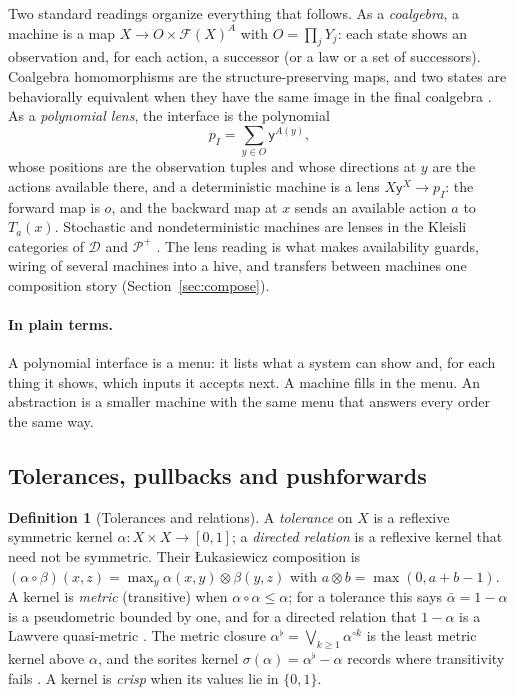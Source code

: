 \documentclass[11pt]{article}
\newcommand{\ab}{\bar\alpha}
\newcommand{\Lt}{\otimes}
\newcommand{\plain}{\paragraph{In plain terms.}}
\theoremstyle{definition}
\newtheorem{definition}{Definition}[section]
\theoremstyle{plain}
\begin{document}
Two standard readings organize everything that follows. As a \emph{coalgebra}, a machine is a
map $X\to O\times\mathcal F(X)^A$ with $O=\prod_j Y_j$: each state shows an observation and,
for each action, a successor (or a law or a set of successors). Coalgebra homomorphisms are the
structure-preserving maps, and two states are behaviorally equivalent when they have the same
image in the final coalgebra \cite{rutten}. As a \emph{polynomial lens}, the interface is the
polynomial
\[
p_I=\sum_{y\in O} \mathsf y^{A(y)},
\]
whose positions are the observation tuples and whose directions at $y$ are the actions
available there, and a deterministic machine is a lens $X\mathsf y^X\to p_I$: the forward map is
$o$, and the backward map at $x$ sends an available action $a$ to $T_a(x)$. Stochastic and
nondeterministic machines are lenses in the Kleisli categories of $\mathcal D$ and
$\mathcal P^+$ \cite{niuspivak}. The lens reading is what makes availability guards, wiring of
several machines into a hive, and transfers between machines one composition story
(Section~\ref{sec:compose}).

\plain A polynomial interface is a menu: it lists what a system can show and, for each thing it
shows, which inputs it accepts next. A machine fills in the menu. An abstraction is a smaller
machine with the same menu that answers every order the same way.

\subsection{Tolerances, pullbacks and pushforwards}\label{sec:tolerances}

\begin{definition}[Tolerances and relations]\label{def:tolerance}
A \emph{tolerance} on $X$ is a reflexive symmetric kernel $\alpha:X\times X\to[0,1]$; a
\emph{directed relation} is a reflexive kernel that need not be symmetric. Their
\L{}ukasiewicz composition is $(\alpha\circ\beta)(x,z)=\max_y \alpha(x,y)\Lt\beta(y,z)$ with
$a\Lt b=\max(0,a+b-1)$. A kernel is \emph{metric} (transitive) when $\alpha\circ\alpha\le\alpha$;
for a tolerance this says $\ab=1-\alpha$ is a pseudometric bounded by one, and for a directed
relation that $1-\alpha$ is a Lawvere quasi-metric \cite{lawvere}. The metric closure
$\alpha^\flat=\bigvee_{k\ge1}\alpha^{\circ k}$ is the least metric kernel above $\alpha$, and the
sorites kernel $\sigma(\alpha)=\alpha^\flat-\alpha$ records where transitivity fails
\cite{dcnotes,dclosure}. A kernel is \emph{crisp} when its values lie in $\{0,1\}$.
\end{definition}
\end{document}
